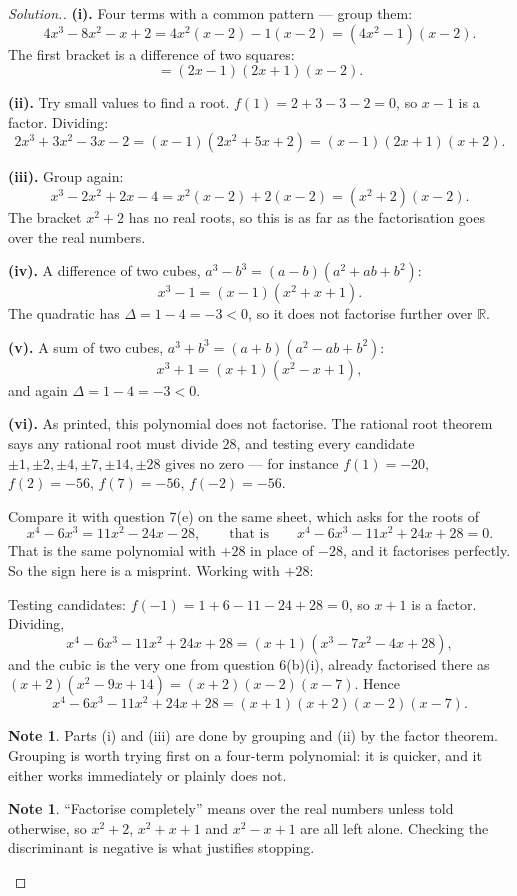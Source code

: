 \documentclass[11pt,a4paper]{article}
\theoremstyle{definition}
\newtheorem{note}[thm]{Note}
\newenvironment{solution}
  {\renewcommand{\qedsymbol}{}\begin{proof}[\textit{Solution}.]}
  {\end{proof}}
\begin{document}
\begin{solution}
\textbf{(i).} Four terms with a common pattern --- group them:
$$4x^3-8x^2-x+2=4x^2(x-2)-1(x-2)=\left(4x^2-1\right)(x-2).$$
The first bracket is a difference of two squares:
$$=(2x-1)(2x+1)(x-2).$$

\textbf{(ii).} Try small values to find a root. $f(1)=2+3-3-2=0$, so $x-1$ is a factor.
Dividing:
$$2x^3+3x^2-3x-2=(x-1)\left(2x^2+5x+2\right)=(x-1)(2x+1)(x+2).$$

\textbf{(iii).} Group again:
$$x^3-2x^2+2x-4=x^2(x-2)+2(x-2)=\left(x^2+2\right)(x-2).$$
The bracket $x^2+2$ has no real roots, so this is as far as the factorisation goes over
the real numbers.

\textbf{(iv).} A difference of two cubes, $a^3-b^3=(a-b)\left(a^2+ab+b^2\right)$:
$$x^3-1=(x-1)\left(x^2+x+1\right).$$
The quadratic has $\Delta=1-4=-3<0$, so it does not factorise further over $\mathbb{R}$.

\textbf{(v).} A sum of two cubes, $a^3+b^3=(a+b)\left(a^2-ab+b^2\right)$:
$$x^3+1=(x+1)\left(x^2-x+1\right),$$
and again $\Delta=1-4=-3<0$.

\textbf{(vi).} As printed, this polynomial does not factorise. The rational root theorem
says any rational root must divide $28$, and testing every candidate
$\pm 1,\pm 2,\pm 4,\pm 7,\pm 14,\pm 28$ gives no zero --- for instance $f(1)=-20$,
$f(2)=-56$, $f(7)=-56$, $f(-2)=-56$.

Compare it with question 7(e) on the same sheet, which asks for the roots of
$$x^4-6x^3=11x^2-24x-28,\qquad\text{that is}\qquad x^4-6x^3-11x^2+24x+28=0.$$
That is the same polynomial with $+28$ in place of $-28$, and it factorises perfectly.
So the sign here is a misprint. Working with $+28$:

Testing candidates: $f(-1)=1+6-11-24+28=0$, so $x+1$ is a factor. Dividing,
$$x^4-6x^3-11x^2+24x+28=(x+1)\left(x^3-7x^2-4x+28\right),$$
and the cubic is the very one from question 6(b)(i), already factorised there as
$(x+2)\left(x^2-9x+14\right)=(x+2)(x-2)(x-7)$. Hence
$$x^4-6x^3-11x^2+24x+28=(x+1)(x+2)(x-2)(x-7).$$

\begin{note}
Parts (i) and (iii) are done by grouping and (ii) by the factor theorem. Grouping is
worth trying first on a four-term polynomial: it is quicker, and it either works
immediately or plainly does not.
\end{note}

\begin{note}
``Factorise completely'' means over the real numbers unless told otherwise, so
$x^2+2$, $x^2+x+1$ and $x^2-x+1$ are all left alone. Checking the discriminant is
negative is what justifies stopping.
\end{note}
\end{solution}
\end{document}
